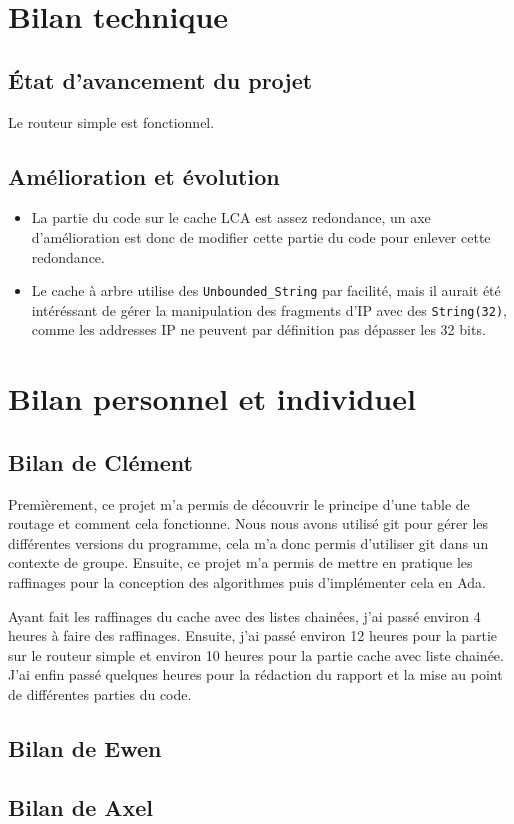\documentclass{article}
\begin{document}
\section{Bilan technique}
\subsection{État d'avancement du projet}
Le routeur simple est fonctionnel.\par

\subsection{Amélioration et évolution}
\begin{itemize}
    \item La partie du code sur le cache LCA est assez redondance, un axe d'amélioration est donc de modifier cette partie du code pour enlever cette redondance.
    \item Le cache à arbre utilise des \verb|Unbounded_String| par facilité, mais il aurait été intéréssant de gérer la manipulation des fragments d'IP avec des \verb|String(32)|, comme les addresses IP ne peuvent par définition pas dépasser les 32 bits.
\end{itemize}

\section{Bilan personnel et individuel}
\subsection{Bilan de Clément}
Premièrement, ce projet m'a permis de découvrir le principe d'une table de routage et comment cela fonctionne. Nous nous avons utilisé git pour gérer les différentes versions du programme, cela m'a donc permis d'utiliser git dans un contexte de groupe. Ensuite, ce projet m'a permis de mettre en pratique les raffinages pour la conception des algorithmes puis d'implémenter cela en Ada.\par
Ayant fait les raffinages du cache avec des listes chainées, j'ai passé environ 4 heures à faire des raffinages. Ensuite, j'ai passé environ 12 heures pour la partie sur le routeur simple et environ 10 heures pour la partie cache avec liste chainée. J'ai enfin passé quelques heures pour la rédaction du rapport et la mise au point de différentes parties du code.
\subsection{Bilan de Ewen}
\subsection{Bilan de Axel}
\end{document}
